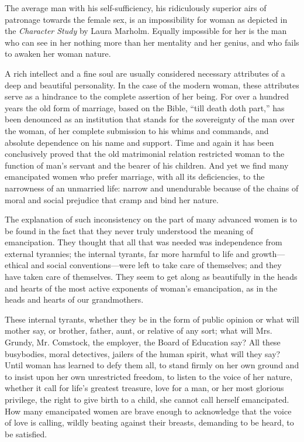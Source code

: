 The average man with his self-sufficiency, his ridiculously superior
airs of patronage towards the female sex, is an impossibility for
woman as depicted in the \textit{Character Study} by Laura Marholm.
Equally impossible for her is the man who can see in her nothing more
than her mentality and her genius, and who fails to awaken her woman
nature.

A rich intellect and a fine soul are usually considered necessary
attributes of a deep and beautiful personality. In the case of the
modern woman, these attributes serve as a hindrance to the complete
assertion of her being. For over a hundred years the old 
form of marriage, based on the Bible,  ``till death doth part,'' has
been denounced as an institution that stands for the sovereignty of
the man over the woman, of her complete submission to his whims and
commands, and absolute dependence on his name and support. Time and
again it has been conclusively proved that the old matrimonial
relation restricted woman to the function of man's servant and the
bearer of his children. And yet we find many emancipated women who
prefer marriage, with all its deficiencies, to the narrowness of an
unmarried life: narrow and unendurable because of the chains of moral
and social prejudice that cramp and bind her nature.

The explanation of such inconsistency on the part of many advanced
women is to be found in the fact that they never truly understood the
meaning of emancipation. They thought that all that was needed was
independence from external tyrannies; the internal tyrants, far more
harmful to life and growth---ethical and social conventions---were
left to take care of themselves; and they have taken care of
themselves. They seem to get along as beautifully in the heads and
hearts of the most active exponents of woman's emancipation, as in the
heads and hearts of our grandmothers.

These internal tyrants, whether they be in the form of public opinion
or what will mother say, or brother, father, aunt, or relative of any
sort; what will Mrs. Grundy, Mr. Comstock, the employer, the Board of
Education say? All these busybodies, moral detectives, jailers of the
human spirit, what  will they say? Until woman has learned
to defy them all, to stand firmly on her own ground and to insist upon
her own unrestricted freedom, to listen to the voice of her nature,
whether it call for life's greatest treasure, love for a man, or her
most glorious privilege, the right to give birth to a child, she
cannot call herself emancipated. How many emancipated women are brave
enough to acknowledge that the voice of love is calling, wildly
beating against their breasts, demanding to be heard, to be satisfied.

